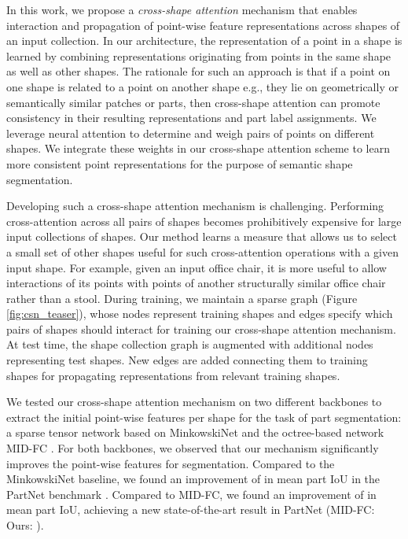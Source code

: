 \documentclass{egpubl}
\begin{document}
In this work, we propose a \emph{cross-shape attention} mechanism that enables interaction and propagation of point-wise feature representations 
across shapes of an input collection. In our architecture, the representation of a point in a shape is learned by combining
representations originating from points in the same shape as well as other shapes. The rationale for such an approach is that if a point on one
shape is related to a point on another shape e.g., they lie on geometrically or semantically similar patches or parts, then cross-shape 
attention can promote consistency in their resulting representations and part label assignments. We leverage neural attention to 
determine and weigh pairs of points on different shapes. We integrate these weights in our cross-shape attention scheme to learn more consistent point representations for the purpose of semantic shape segmentation. 

Developing such a cross-shape attention mechanism is challenging. Performing cross-attention across all pairs of shapes becomes prohibitively  expensive   for large input collections of shapes. Our method learns a measure that allows us to select a small set of other shapes useful for such cross-attention operations with a given input shape. For example, given an input office chair, it is more useful to allow interactions of its points with points of another structurally similar office chair rather than a stool.
During training, we maintain a sparse graph (Figure \ref{fig:csn_teaser}),
whose nodes represent training shapes and edges specify which pairs of shapes should interact for training our cross-shape attention mechanism. At test time, the shape collection graph is augmented with additional nodes representing test shapes. New edges are added connecting them to training shapes for propagating representations from relevant training shapes.

We tested our cross-shape attention mechanism on two different backbones to extract the initial point-wise features per shape for the task of part segmentation: a sparse tensor network based on MinkowskiNet \cite{Choy:2019} and the octree-based network MID-FC \cite{Wang:2021}. For both backbones, we observed that our mechanism significantly improves the point-wise features for segmentation. Compared to the MinkowskiNet baseline, we found an improvement of  in  mean part IoU in the PartNet benchmark \cite{mo2019partnet}. Compared to MID-FC, we found an improvement of   in  mean part IoU, achieving a new state-of-the-art result in PartNet (MID-FC:   Ours: ).
\end{document}
